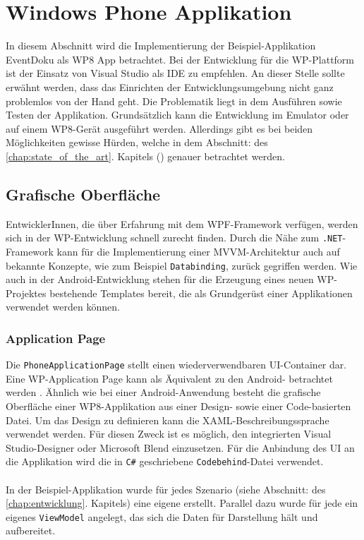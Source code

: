 \documentclass[Bachelorarbeit.tex]{subfiles}
\begin{document}
\section{Windows Phone Applikation}
\label{sec:wp_app}

In diesem Abschnitt wird die Implementierung der Beispiel-Applikation EventDoku als \ac{WP}8 App betrachtet. 
Bei der Entwicklung für die \ac{WP}-Plattform ist der Einsatz von Visual Studio als \ac{IDE} zu empfehlen. 
An dieser Stelle sollte erwähnt werden, dass das Einrichten der Entwicklungsumgebung nicht ganz problemlos von der Hand geht.
Die Problematik liegt in dem Ausführen sowie Testen der Applikation.
Grundsätzlich kann die Entwicklung im Emulator oder auf einem \ac{WP}8-Gerät ausgeführt werden. 
Allerdings gibt es bei beiden Möglichkeiten gewisse Hürden, welche in dem Abschnitt:  des \ref{chap:state_of_the_art}. Kapitels () genauer betrachtet werden.
  


\subsection*{Grafische Oberfläche}


EntwicklerInnen, die über Erfahrung mit dem \ac{WPF}-Framework verfügen, werden sich in der \ac{WP}-Entwicklung schnell zurecht finden.
Durch die Nähe zum \texttt{.NET}-Framework kann für die Implementierung einer \ac{MVVM}-Architektur auch auf bekannte Konzepte, wie zum Beispiel \texttt{Databinding}, zurück gegriffen werden. 
Wie auch in der Android-Entwicklung stehen für die Erzeugung eines neuen \ac{WP}-Projektes bestehende Templates bereit, die als Grundgerüst einer Applikationen verwendet werden können.
 
\subsubsection*{Application Page}
\label{subsubsec:application-page}

Die \texttt{PhoneApplicationPage} stellt einen wiederverwendbaren \ac{UI}-Container dar. 
Eine \ac{WP}-Application Page kann als Äquivalent zu den Android- betrachtet werden \parencite[vgl.:][]{wp8_vglAndroid}. 
Ähnlich wie bei einer Android-Anwendung besteht die grafische Oberfläche einer \ac{WP}8-Applikation aus einer Design- sowie einer Code-basierten Datei. 
Um das Design zu definieren kann die \ac{XAML}-Beschreibungssprache verwendet werden. 
Für diesen Zweck ist es möglich, den integrierten Visual Studio-Designer oder Microsoft Blend einzusetzen.
Für die Anbindung des \ac{UI} an die Applikation wird die in  \texttt{C\#} geschriebene \texttt{Codebehind}-Datei verwendet.\\
\\
In der Beispiel-Applikation wurde für jedes Szenario (siehe Abschnitt:  des \ref{chap:entwicklung}. Kapitels) eine eigene  erstellt.
Parallel dazu wurde für jede 
ein eigenes \texttt{ViewModel} angelegt, das sich die Daten für Darstellung hält und aufbereitet.
\end{document}
